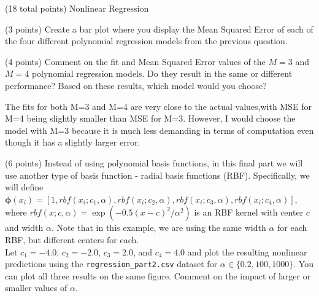 \documentclass[12pt]{article}
\begin{document}
\begin{question}{(18 total points) Nonlinear Regression}
\begin{subquestion}{(3 points) Create a bar plot where you display the Mean Squared Error of each of the four different polynomial regression models from the previous question.}
\end{subquestion}


%
%
\begin{subquestion}{(4 points) Comment on the fit and Mean Squared Error values of the $M=3$ and $M=4$ polynomial regression models. 
Do they result in the same or different performance? 
Based on these results, which model would you choose?}


\begin{answerbox}{15em}
The fits for both M=3 and M=4 are very close to the actual values,with MSE for M=4 being slightly smaller than MSE for M=3.
However, I would choose the model with M=3 because it is much less demanding in terms of computation even though it has a slightly larger error.
\end{answerbox}



\end{subquestion}



%
%
\begin{subquestion}{(6 points) Instead of using polynomial basis functions, in this final part we will use another type of basis function - radial basis functions (RBF). 
Specifically, we will define $\boldsymbol{\phi}(x_i) = [1, rbf(x_i; c_1, \alpha), rbf(x_i; c_2, \alpha), rbf(x_i; c_3, \alpha), rbf(x_i; c_4, \alpha)]$, where $rbf(x; c, \alpha) =  \exp(-0.5(x-c)^2 / \alpha^2)$ is an RBF kernel with center $c$ and width $\alpha$. Note that in this example, we are using the same width $\alpha$ for each RBF, but different centers for each.\\ 
Let $c_1=-4.0$, $c_2=-2.0$, $c_3=2.0$, and $c_4=4.0$ and plot the resulting nonlinear predictions using the \texttt{regression\_part2.csv} dataset for $\alpha \in \{0.2, 100, 1000\}$. 
You can plot all three results on the same figure.
Comment on the impact of larger or smaller values of $\alpha$.
}






\end{subquestion}
\end{question}
\end{document}
